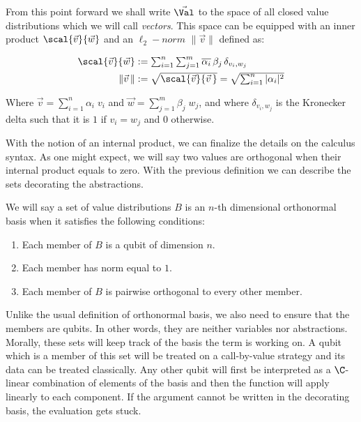 From this point forward we shall write $\vec{\Val}$ to the space of all closed value distributions which we will call \emph{vectors}. This space can be equipped with an inner product $\scal{\vec v}{\vec w}$ and an $\ell_2-norm$ $\|\vec v\|$ defined as:

\begin{align*}
  \textstyle\scal{\vec{v}}{\vec{w}}&:=\textstyle\sum_{i=1}^n\sum_{j=1}^m\overline{\alpha_i}\,\beta_j\,\delta_{v_i,w_j}\\
  \textstyle\|\vec{v}\,\|&:=\textstyle\sqrt{\scal{\vec{v}}{\vec{v}\,}}=\textstyle\sqrt{\sum_{i=1}^n|\alpha_i|^2}    
\end{align*}

Where $\vec{v}=\sum_{i=1}^n\alpha_i\; v_i$ and $\vec{w}=\sum_{j=1}^m\beta_j\; w_j$, and where $\delta_{v_i,w_j}$ is the Kronecker delta such that it is $1$ if $v_i=w_j$ and $0$ otherwise.

With the notion of an internal product, we can finalize the details on the calculus syntax. As one might expect, we will say two values are orthogonal when their internal product equals to zero. With the previous definition we can describe the sets decorating the abstractions.

\begin{definition}\label{def:NthDimensionalBasis}
We will say a set of value distributions $B$ is an $n$-th dimensional orthonormal basis when it satisfies the following conditions:
\begin{enumerate}
  \item Each member of $B$ is a qubit of dimension $n$.
  \item Each member has norm equal to $1$.
  \item Each member of $B$ is pairwise orthogonal to every other member. 
\end{enumerate}
\end{definition}

Unlike the usual definition of orthonormal basis, we also need to ensure that the members are qubits. In other words, they are neither variables nor abstractions. Morally, these sets will keep track of the basis the term is working on. A qubit which is a member of this set will be treated on a call-by-value strategy and its data can be treated classically. Any other qubit will first be interpreted as a $\C$-linear combination of elements of the basis and then the function will apply linearly to each component. If the argument cannot be written in the decorating basis, the evaluation gets stuck. 

